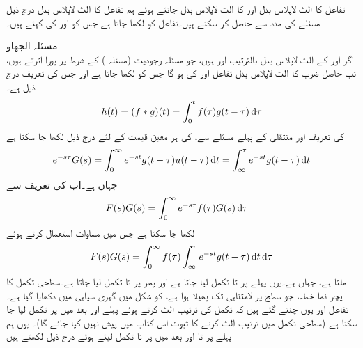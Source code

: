 تفاعل  کا الٹ لاپلاس بدل  اور  کا الٹ لاپلاس بدل  جانتے ہوئے ہم تفاعل  کا الٹ لاپلاس بدل  درج ذیل مسئلے کی مدد سے حاصل کر سکتے ہیں۔تفاعل  کو  لکھا جاتا ہے جس کو  اور  کی  کہتے ہیں۔

\quad مسئلہ الجھاو\\
اگر  اور  کے الٹ لاپلاس بدل بالترتیب  اور  ہوں، جو مسئلہ وجودیت (مسئلہ ) کے شرط پر پورا اترتے ہوں، تب حاصل ضرب  کا الٹ لاپلاس بدل  تفاعل  اور  کی  ہو گا جس کو  لکھا جاتا ہے اور جس کی تعریف درج ذیل ہے۔
\begin{align}\label{مساوات_لاپلاس_الجھاو_تعریف}
h(t)=(f*g)(t)=\int_{0}^{t}f(\tau)g(t-\tau)\dif \tau
\end{align}
 کی تعریف اور منتقلی کے پہلے مسئلے  سے،  کی ہر معین قیمت کے لئے درج ذیل لکھا جا سکتا ہے
\begin{align}\label{مساوات_لاپلاس_الجھاو_الف}
e^{-s\tau}G(s)=\int_{0}^{\infty}e^{-st}g(t-\tau)u(t-\tau)\dif t=\int_{\infty}^{\tau} e^{-st}g(t-\tau)\dif t
\end{align}
جہاں  ہے۔اب  کی تعریف سے
\begin{align*}
F(s)G(s)&=\int_{0}^{\infty}e^{-s\tau}f(\tau)G(s)\dif \tau
\end{align*}
لکھا جا سکتا ہے جس میں مساوات  استعمال کرتے ہوئے
\begin{align*}
F(s)G(s)=\int_{0}^{\infty} f(\tau)\int_{\infty}^{\tau} e^{-st}g(t-\tau)\dif t \dif \tau
\end{align*}
ملتا ہے، جہاں  ہے۔یوں پہلے  پر  تا  تکمل لیا جاتا ہے اور پھر  پر  تا  تکمل لیا جاتا ہے۔سطحی تکمل کا پچر نما خطہ، جو  سطح پر لامتناہی تک پھیلا ہوا ہے، کو شکل  میں گہری سیاہی میں دکھایا گیا ہے۔ تفاعل   اور  یوں چننے گئے ہیں کہ تکمل کی ترتیب الٹ کرتے ہوئے پہلے  اور بعد میں  پر تکمل لیا جا سکتا ہے (سطحی تکمل میں ترتیب الٹ کرنے کا ثبوت اس کتاب میں پیش نہیں کیا جائے گا)۔ یوں ہم پہلے  پر  تا  اور بعد میں  پر  تا  تکمل لیتے ہوئے درج ذیل لکھتے ہیں
